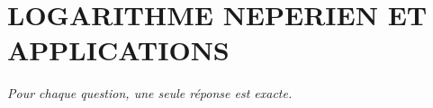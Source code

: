 
\section*{\textcolor{chapcolor}{\MakeUppercase{Logarithme neperien et applications}}}

\begin{center}
\textit{Pour chaque question, une seule réponse est exacte.}
\end{center}

